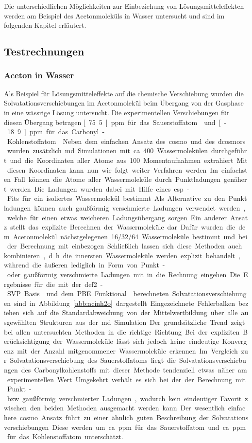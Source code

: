 Die unterschiedlichen Möglichkeiten zur Einbeziehung von Lösungsmitteleffekten werden am Beispiel des Acetonmoleküls in Wasser untersucht und sind im folgenden Kapitel erläutert.
	
	\subsection{Testrechnungen}\label{lömitest}
	\subsubsection{Aceton in Wasser}
	Als Beispiel für Lösungsmitteleffekte auf die chemische Verschiebung wurden die Solvatationsverschiebungen im Acetonmolekül beim Übergang von der Gasphase in eine wässrige Lösung untersucht. Die experimentellen Verschiebungen für diesen Übergang betragen \unit[75.5]{ppm} für das Sauerstoffatom\supercite{cossi2003different} und \unit[-18.9]{ppm} für das Carbonyl-Kohlenstoffatom\supercite{tiffon1978effet}. Neben dem einfachen Ansatz des \ac{cosmo} und des \ac{dcosmors} wurden zusätzlich \ac{md} Simulationen mit ca. 400 Wassermolekülen durchgeführt und die Koordinaten aller Atome aus 100 Momentaufnahmen extrahiert. Mit diesen Koordinaten kann nun wie folgt weiter Verfahren werden. Im einfachsten Fall können die Atome aller Wassermoleküle durch Punktladungen genähert werden. Die Ladungen wurden dabei mit Hilfe eines \acs{esp}-Fits für ein isoliertes Wassermolekül bestimmt. Als Alternative zu den Punktladungen können auch gaußförmig verschmierte Ladungen verwendet werden, welche für einen etwas weicheren Ladungsübergang sorgen. Ein anderer Ansatz stellt das explizite Berechnen der Wassermoleküle dar. Dafür wurden die dem Acetonmolekül nächstgelegenen 16/32/64 Wassermoleküle bestimmt und bei der Berechnung mit einbezogen. Schließlich lassen sich diese Methoden auch kombinieren, d.h. die innersten Wassermoleküle werden explizit behandelt, während die äußeren lediglich in Form von Punkt- oder gaußförmig verschmierte Ladungen mit in die Rechnung eingehen. Die Ergebnisse für die mit der def2-SVP Basis\supercite{weigend2005balanced} und dem PBE Funktional\supercite{perdew1996generalized} berechneten Solvatationsverschiebungen sind in Abbildung \ref{abb:acinh2o} dargestellt. Eingezeichnete Fehlerbalken beziehen sich auf die Standardabweichung von der Mittelwertbildung über alle ausgewählten Strukturen aus der \ac{md} Simulation. Der grundsätzliche Trend zeigt bei allen untersuchten Methoden in die richtige Richtung. Bei der expliziten Berücksichtigung der Wassermoleküle lässt sich jedoch keine eindeutige Konvergenz mit der Anzahl mitgenommener Wassermoleküle erkennen. Im Vergleich zur Solvatationsverschiebung des Sauerstoffatoms liegt die Solvatationsverschiebungen des Carbonylkohlenstoffs mit dieser Methode tendenziell etwas näher am experimentellen Wert. Umgekehrt verhält es sich bei der der Berechnung mit Punkt- bzw. gaußförmig verschmierter Ladungen, wodurch kein eindeutiger Favorit zwischen den beiden Methoden ausgemacht werden kann. Der wesentlich einfachere \ac{cosmo} Ansatz führt zu einer ähnlich guten Beschreibung der Solvatationsverschiebungen. Diese werden um ca. \unit[25]{ppm} für das Sauerstoffatom und ca. \unit[9]{ppm} für das Kohlenstoffatom unterschätzt. 
